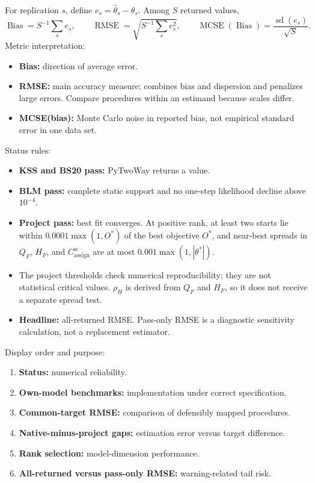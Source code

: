 \documentclass[11pt]{article}
\newcommand{\QF}{Q_F}
\newcommand{\HF}{H_F}
\newcommand{\rhoH}{\rho_H}
\newcommand{\Cassign}{C^{w}_{\mathrm{assign}}}
\begin{document}
For replication $s$, define $e_s=\widehat\theta_s-\theta_s$.  Among $S$
returned values,
\begin{equation}
\operatorname{Bias}=S^{-1}\sum_se_s,\qquad
\operatorname{RMSE}=\sqrt{S^{-1}\sum_se_s^2},\qquad
\operatorname{MCSE}(\operatorname{Bias})=
\frac{\operatorname{sd}(e_s)}{\sqrt S}. \label{eq:metrics}
\end{equation}
Metric interpretation:
\begin{itemize}
\item \textbf{Bias:} direction of average error.
\item \textbf{RMSE:} main accuracy measure; combines bias and dispersion and
penalizes large errors.  Compare procedures within an estimand because scales
differ.
\item \textbf{MCSE(bias):} Monte Carlo noise in reported bias, not empirical
standard error in one data set.
\end{itemize}

Status rules:
\begin{itemize}
\item \textbf{KSS and BS20 pass:} PyTwoWay returns a value.
\item \textbf{BLM pass:} complete static support and no one-step likelihood
decline above $10^{-4}$.
\item \textbf{Project pass:} best fit converges.  At positive rank, at least
two starts lie within $0.0001\max(1,O^*)$ of the best objective $O^*$, and
near-best spreads in $\QF$, $\HF$, and $\Cassign$ are at most
$0.001\max(1,|\theta^*|)$.
\item The project thresholds check numerical reproducibility; they are not
statistical critical values.  $\rhoH$ is derived from $\QF$ and $\HF$, so it
does not receive a separate spread test.
\item \textbf{Headline:} all-returned RMSE.  Pass-only RMSE is a diagnostic
sensitivity calculation, not a replacement estimator.
\end{itemize}

Display order and purpose:
\begin{enumerate}
\item \textbf{Status:} numerical reliability.
\item \textbf{Own-model benchmarks:} implementation under correct specification.
\item \textbf{Common-target RMSE:} comparison of defensibly mapped procedures.
\item \textbf{Native-minus-project gaps:} estimation error versus target difference.
\item \textbf{Rank selection:} model-dimension performance.
\item \textbf{All-returned versus pass-only RMSE:} warning-related tail risk.
\end{enumerate}
\end{document}

